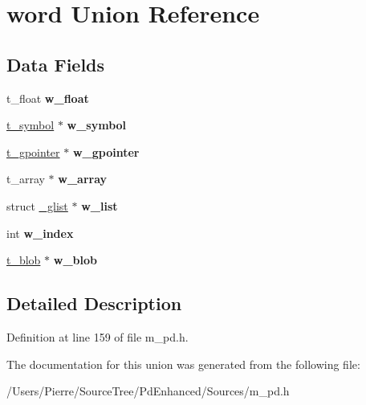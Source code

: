 \hypertarget{unionword}{\section{word Union Reference}
\label{unionword}
}
\subsection*{Data Fields}
\begin{DoxyCompactItemize}
\item 
\hypertarget{unionword_a3c5165bbd8505472fd8608dcb99b7ab9}{t\-\_\-float {\bfseries w\-\_\-float}}\label{unionword_a3c5165bbd8505472fd8608dcb99b7ab9}

\item 
\hypertarget{unionword_a89a95e26fb2b30ebe70204de2c3fa099}{\hyperlink{struct__symbol}{t\-\_\-symbol} $\ast$ {\bfseries w\-\_\-symbol}}\label{unionword_a89a95e26fb2b30ebe70204de2c3fa099}

\item 
\hypertarget{unionword_a93fe0df3a2b3388336f6e71b55742d6c}{\hyperlink{struct__gpointer}{t\-\_\-gpointer} $\ast$ {\bfseries w\-\_\-gpointer}}\label{unionword_a93fe0df3a2b3388336f6e71b55742d6c}

\item 
\hypertarget{unionword_af8427520e3abf9c0d26732a38056d6cb}{t\-\_\-array $\ast$ {\bfseries w\-\_\-array}}\label{unionword_af8427520e3abf9c0d26732a38056d6cb}

\item 
\hypertarget{unionword_a849bfad495d86a401a0228015b90c9ac}{struct \hyperlink{struct__glist}{\-\_\-glist} $\ast$ {\bfseries w\-\_\-list}}\label{unionword_a849bfad495d86a401a0228015b90c9ac}

\item 
\hypertarget{unionword_a985fdabd5996a0ae1ed311855f8e4be7}{int {\bfseries w\-\_\-index}}\label{unionword_a985fdabd5996a0ae1ed311855f8e4be7}

\item 
\hypertarget{unionword_a0a295f8aa063fc5add223c870ef7323b}{\hyperlink{struct__blob}{t\-\_\-blob} $\ast$ {\bfseries w\-\_\-blob}}\label{unionword_a0a295f8aa063fc5add223c870ef7323b}

\end{DoxyCompactItemize}


\subsection{Detailed Description}


Definition at line 159 of file m\-\_\-pd.\-h.



The documentation for this union was generated from the following file\-:\begin{DoxyCompactItemize}
\item 
/\-Users/\-Pierre/\-Source\-Tree/\-Pd\-Enhanced/\-Sources/m\-\_\-pd.\-h\end{DoxyCompactItemize}
